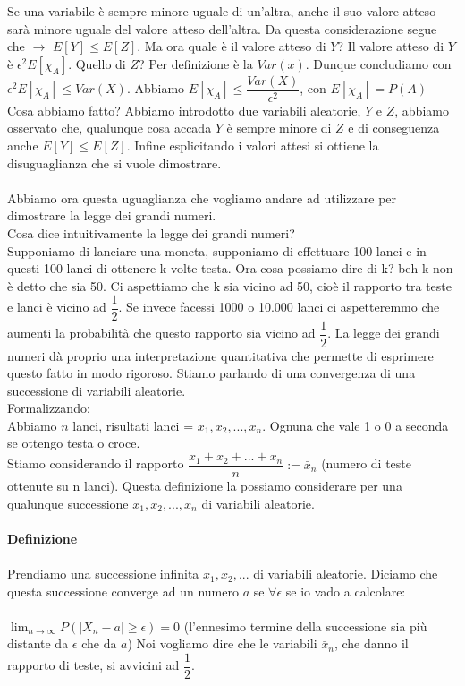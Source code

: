 \documentclass[a4paper,12pt]{report}
\begin{document}
	Se una variabile è sempre minore uguale di un'altra, anche il suo valore atteso sarà minore uguale del valore atteso dell'altra. Da questa considerazione segue che $\rightarrow$ $E[Y] \leq E[Z]$. Ma ora quale è il valore atteso di $Y$? Il valore atteso di $Y$ è $\epsilon^2 E[\chi_{A}]$. Quello di $Z$? Per definizione è la $Var(x)$. Dunque concludiamo con $\epsilon^2 E[\chi_{A}] \leq Var(X)$. Abbiamo $E[\chi_{A}] \leq \dfrac{Var(X)}{\epsilon^2}$, con $E[\chi_{A}] = P(A)$
	Cosa abbiamo fatto? Abbiamo introdotto due variabili aleatorie, $Y$ e $Z$, abbiamo osservato che, qualunque cosa accada $Y$ è sempre minore di $Z$ e di conseguenza anche $E[Y] \leq E[Z]$. Infine esplicitando i valori attesi si ottiene la disuguaglianza che si vuole dimostrare. \\\\
	Abbiamo ora questa uguaglianza che vogliamo andare ad utilizzare per dimostrare la legge dei grandi numeri. \\
	Cosa dice intuitivamente la legge dei grandi numeri? \\
	Supponiamo di lanciare una moneta, supponiamo di effettuare 100 lanci e in questi 100 lanci di ottenere k volte testa. Ora cosa possiamo dire di k? beh k non è detto che sia 50. Ci aspettiamo che k sia vicino ad 50, cioè il rapporto tra teste e lanci è vicino ad $\dfrac{1}{2}$. Se invece facessi 1000 o 10.000 lanci ci aspetteremmo che aumenti la probabilità che questo rapporto sia vicino ad $\dfrac{1}{2}$. La legge dei grandi numeri dà proprio una interpretazione quantitativa che permette di esprimere questo fatto in modo rigoroso. Stiamo parlando di una convergenza di una successione di variabili aleatorie. \\
	Formalizzando:\\
	Abbiamo $n$ lanci, risultati lanci = $x_1, x_2, ..., x_n$. Ognuna che vale 1 o 0 a seconda se ottengo testa o croce. \\Stiamo considerando il rapporto $\dfrac{x_1+x_2+...+x_n}{n} := \bar x_{n}$ (numero di teste ottenute su n lanci).
	Questa definizione la possiamo considerare per una qualunque successione $x_1, x_2, ..., x_n$ di variabili aleatorie. \\\\
	\textbf{Definizione}\\\\
	Prendiamo una successione infinita $x_1, x_2, ...$ di variabili aleatorie. Diciamo che questa successione converge ad un numero $a$ se $\forall \epsilon$ se io vado a calcolare: \\\\
	$\lim_{n \rightarrow \infty} P(|X_{n} - a| \geq \epsilon) = 0$
	(l'ennesimo termine della successione sia più distante da $\epsilon$ che da $a$)
	Noi vogliamo dire che le variabili $\bar x_{n}$, che danno il rapporto di teste, si avvicini ad $\dfrac{1}{2}$. \\\\
	
\end{document}
